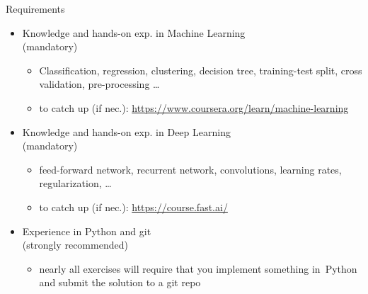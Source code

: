 % 
% 
\begin{frame}[c]{Requirements}

\begin{itemize}
  \item Knowledge and hands-on exp. in \alert{Machine Learning}\\ (mandatory)
  \begin{itemize}
    \item Classification, regression, clustering, decision tree, training-test split, cross validation, pre-processing \ldots
    \item to catch up (if nec.): \url{https://www.coursera.org/learn/machine-learning} 
  \end{itemize}
  \pause
  \item Knowledge and hands-on exp. in \alert{Deep Learning}\\ (mandatory)
  \begin{itemize}
    \item feed-forward network, recurrent network, convolutions, learning rates, regularization, \ldots 
    \item to catch up (if nec.): \url{https://course.fast.ai/}
  \end{itemize}
  \pause
  \item Experience in \alert{Python and git}\\ (strongly recommended)
  \begin{itemize}
    \item nearly all exercises will require 
    that you implement something in~Python and submit the solution to a git repo
  \end{itemize}
\end{itemize}

\end{frame}
